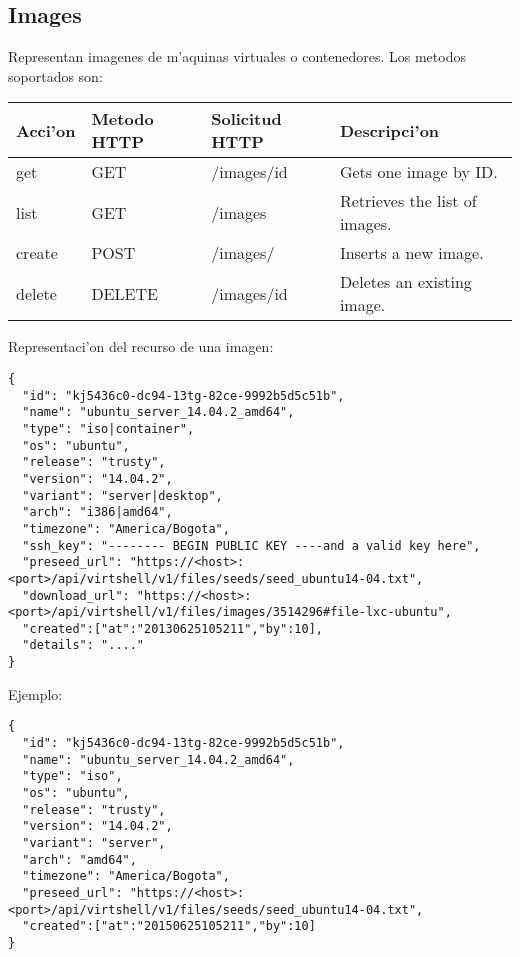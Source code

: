 \subsection{Images}
Representan imagenes de m'aquinas virtuales o contenedores. Los metodos soportados son:

\begin{center}
 \begin{tabular}{| l | l | l | l |}
 \hline
  \rowcolor{blueapi}
  \textbf{Acci'on} & \textbf{Metodo HTTP} & \textbf{Solicitud HTTP} & \textbf{Descripci'on} \\ [0.5ex] 
  \hline\hline
  get & GET & /images/id & Gets one image by ID. \\
  \hline
  list & GET & /images & Retrieves the list of images. \\
  \hline  
  create & POST & /images/ & Inserts a new image. \\
  \hline
  delete & DELETE & /images/id & Deletes an existing image. \\ [1ex] 
  \hline
\end{tabular}
\end{center}

\vspace{1cm}
Representaci'on del recurso de una imagen:
\vspace{1cm}

\begin{lstlisting}[style=json]
{
  "id": "kj5436c0-dc94-13tg-82ce-9992b5d5c51b",
  "name": "ubuntu_server_14.04.2_amd64",
  "type": "iso|container",
  "os": "ubuntu", 
  "release": "trusty",
  "version": "14.04.2", 
  "variant": "server|desktop", 
  "arch": "i386|amd64", 
  "timezone": "America/Bogota", 
  "ssh_key": "-------- BEGIN PUBLIC KEY ----and a valid key here",
  "preseed_url": "https://<host>:<port>/api/virtshell/v1/files/seeds/seed_ubuntu14-04.txt",
  "download_url": "https://<host>:<port>/api/virtshell/v1/files/images/3514296#file-lxc-ubuntu",
  "created":["at":"20130625105211","by":10],
  "details": "...."
}
\end{lstlisting}

Ejemplo:

\medskip
\begin{lstlisting}[style=json]
{
  "id": "kj5436c0-dc94-13tg-82ce-9992b5d5c51b",
  "name": "ubuntu_server_14.04.2_amd64",
  "type": "iso",
  "os": "ubuntu", 
  "release": "trusty",
  "version": "14.04.2", 
  "variant": "server", 
  "arch": "amd64", 
  "timezone": "America/Bogota", 
  "preseed_url": "https://<host>:<port>/api/virtshell/v1/files/seeds/seed_ubuntu14-04.txt",
  "created":["at":"20150625105211","by":10]
}
\end{lstlisting}

